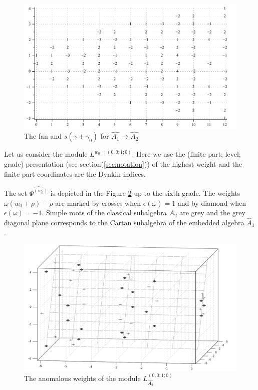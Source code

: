 \documentclass[a4paper,12pt]{article}
\theoremstyle{definition} \newtheorem{Def}{Definition}
\begin{document}
\begin{figure}[h!bt]
  \centering
  \includegraphics[width=135mm]{AffineA2_A1_fan.pdf}
  \caption{The fan and $s(\gamma+\gamma_0)$ for $\hat{A_1}\longrightarrow \hat{A_2}$}
  \label{fig:AffineA2A1Fan}
\end{figure}

Let us consider the module $L^{w_0=(0,0;1;0)}$. Here we use the (finite part; level; grade)
presentation (see section(\ref{sec:notation})) of the highest weight and the finite part
coordinates are the Dynkin indices.

The set $\widehat{\Psi^{(w_0)}}$  is depicted in the Figure
\ref{fig:affine_A2_anom_point} up to the sixth grade.
The weights $\omega (w_0+\rho)-\rho$ are marked by crosses when $\epsilon(\omega)=1$ and
by diamond when $\epsilon(\omega)=-1$. Simple roots of the classical subalgebra $A_2$ are
grey and the grey diagonal plane corresponds to the Cartan subalgebra of
the embedded algebra $\hat{A}_1$.

\begin{figure}[h!tb]
  \includegraphics[width=140mm]{AffineA2_A1_anom.pdf}
  \caption{The anomalous weights of the module $L^{(0,0;1;0)}_{\hat{A_2}}$}
  \label{fig:affine_A2_anom_point}
\end{figure}
\end{document}
